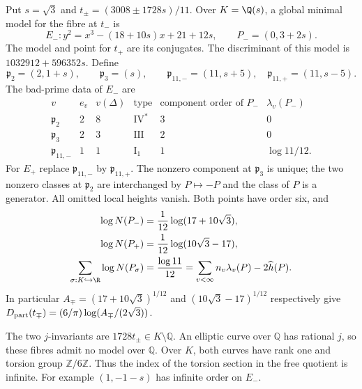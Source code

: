 \begin{proposition}\hypertarget{tag-0016}{}\label{ari:C.6.T2}

Put $s=\sqrt3$ and
$t_\pm=(3008\pm1728s)/11$. Over $K=\Q(s)$, a global minimal
model for the fibre at $t_-$ is
\[
 E_-:y^2=x^3-(18+10s)x+21+12s,\qquad P_-=(0,3+2s).
\]
The model and point for $t_+$ are its conjugates. The
discriminant of this model is $1032912+596352s$. Define
\[
 \mathfrak p_2=(2,1+s),\qquad\mathfrak p_3=(s),\qquad
 \mathfrak p_{11,-}=(11,s+5),\quad
 \mathfrak p_{11,+}=(11,s-5).
\]
The bad-prime data of $E_-$ are
\[
\begin{array}{c|c|c|c|c|c}
v&e_v&v(\Delta)&\text{type}&\text{component order of }P_-&\lambda_v(P_-)\\\hline
\mathfrak p_2&2&8&\mathrm{IV}^*&3&0\\
\mathfrak p_3&2&3&\mathrm{III}&2&0\\
\mathfrak p_{11,-}&1&1&\mathrm I_1&1&\log11/12.
\end{array}
\]
For $E_+$ replace $\mathfrak p_{11,-}$ by
$\mathfrak p_{11,+}$. The nonzero component at
$\mathfrak p_3$ is unique; the two nonzero classes at
$\mathfrak p_2$ are interchanged by $P\mapsto-P$ and the
class of $P$ is a generator. All omitted local heights vanish.
Both points have order six, and
\begin{align*}
 \log N(P_-)&=\frac1{12}\log(17+10\sqrt3),\\
 \log N(P_+)&=\frac1{12}\log(10\sqrt3-17),\\
 \sum_{\sigma:K\hookrightarrow\R}\log N(P_\sigma)
 &=\frac{\log11}{12}
 =\sum_{v<\infty}n_v\lambda_v(P)-2\widehat h(P).
\end{align*}
In particular $A_\mp=(17+10\sqrt3)^{1/12}$ and
$(10\sqrt3-17)^{1/12}$ respectively give
$D_{\rm part}(t_\mp)=(6/\pi)\log(A_\mp/(2\sqrt3))$.

The two $j$-invariants are $1728t_\pm\in K\setminus\mathbb Q$.
An elliptic curve over $\mathbb Q$ has rational $j$, so these
fibres admit no model over $\mathbb Q$.
Over $K$, both curves have rank one and torsion group $\mathbb Z/6\mathbb Z$. Thus the index of the torsion section in the
free quotient is infinite. For example $(1,-1-s)$ has infinite
order on $E_-$.
\end{proposition}


